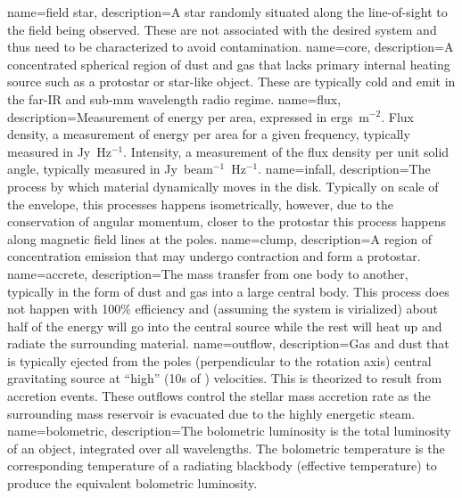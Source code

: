 {

{
        name=field star,
        description={A star randomly situated along the line-of-sight to the field being observed. These are not associated with the desired system and thus need to be characterized to avoid contamination.}
}
{
        name=core,
        description={A concentrated spherical region of dust and gas that lacks  primary internal heating source such as a protostar or star-like object. These are typically cold and emit in the far-IR and sub-mm wavelength radio regime.}
}
{
        name=flux,
        description={Measurement of energy per area, expressed in ergs~m$^{-2}$. Flux density, a measurement of energy per area for a given frequency, typically measured in Jy~Hz$^{-1}$. Intensity, a measurement of the flux density per unit solid angle, typically measured in Jy~beam$^{-1}$~Hz$^{-1}$. }
}
{
        name=infall,
        description={The process by which material dynamically moves in the disk. Typically on scale of the envelope, this processes happens isometrically, however, due to the conservation of angular momentum, closer to the protostar this process happens along magnetic field lines at the poles.}
}
{
        name=clump,
        description={A region of concentration emission that may undergo contraction and form a protostar.}
}
{
        name=accrete,
        description={The mass transfer from one body to another, typically in the form of dust and gas into a large central body. This process does not happen with 100\% efficiency and (assuming the system is virialized) about half of the energy will go into the central source while the rest will heat up and radiate the surrounding material.} %
}
{
        name=outflow,
        description={Gas and dust that is typically ejected from the poles (perpendicular to the rotation axis) central gravitating source at ``high'' (10s of \kms) velocities. This is theorized to result from accretion events. These outflows control the stellar mass accretion rate as the surrounding mass reservoir is evacuated due to the highly energetic steam.}
}
{
        name=bolometric,
        description={The bolometric luminosity is the total luminosity of an object, integrated over all wavelengths. The bolometric temperature is the corresponding temperature of a radiating blackbody (effective temperature) to produce the equivalent bolometric luminosity.}
}}
